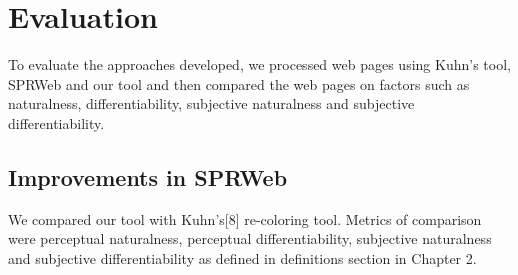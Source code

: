 \chapter{Evaluation}
\thispagestyle{plain}

\label{Evaluation}

To evaluate the approaches developed, we processed web pages using Kuhn's tool, SPRWeb and our tool and then compared the web pages on factors such as naturalness, differentiability, subjective naturalness and subjective differentiability.

\section{Improvements in SPRWeb}
\label{Improvements in SPRWeb}
We compared our tool with Kuhn’s[8] re-coloring tool.  Metrics of comparison were perceptual naturalness, perceptual differentiability, subjective naturalness and subjective differentiability as defined in definitions section in Chapter 2. 

